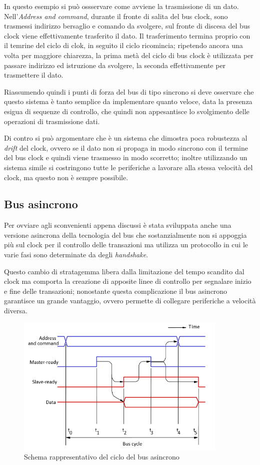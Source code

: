\documentclass[class=book, crop=false, oneside]{standalone}
\begin{document}
In questo esempio si può ossservare come avviene la trasmissione di un dato.
Nell'\emph{Address and command}, durante il fronte di salita del bus clock, sono trasmessi indirizzo bersaglio e comando da svolgere, sul fronte di discesa del bus clock viene effettivamente trasferito il dato.
Il trasferimento termina proprio con il temrine del ciclo di clok, in seguito il ciclo ricomincia; ripetendo ancora una volta per maggiore chiarezza, la prima metà del ciclo di bus clock è utilizzata per passare indirizzo ed istruzione da svolgere, la seconda effettivamente per trasmettere il dato.

Riassumendo quindi i punti di forza del bus di tipo sincrono si deve osservare che questo sistema è tanto semplice da implementare quanto veloce, data la presenza esigua di sequenze di controllo, che quindi non appesantisce lo svolgimento delle operazioni di trasmissione dati.

Di contro si può argomentare che è un sistema che dimostra poca robustezza al \emph{drift} del clock, ovvero se il dato non si propaga in modo sincrono con il  termine del bus clock e quindi viene trasmesso in modo scorretto; inoltre utilizzando un sistema simile si costringono tutte le periferiche a lavorare alla stessa velocità del clock, ma questo non è sempre possibile.

\subsection{Bus asincrono}
Per ovviare agli sconvenienti appena discussi è stata sviluppata anche una versione asincrona della tecnologia del bus che sostanzialmente non si appoggia più sul clock per il controllo delle transazioni ma utilizza un protocollo in cui le varie fasi sono determinate da degli \emph{handshake}.

Questo cambio di stratagemma libera dalla limitazione del tempo scandito dal clock ma comporta la creazione di apposite linee di controllo per segnalare inizio e fine delle transazioni;
nonostante questa complicazione il bus asincrono garantisce un grande vantaggio, ovvero permette di collegare periferiche a velocità diversa.

\begin{figure}[H]
	\centering
	\includegraphics[width=0.9\textwidth,keepaspectratio]{bus-asincrono}
	\caption{Schema rappresentativo del ciclo del bus asincrono}
\end{figure}
\end{document}
